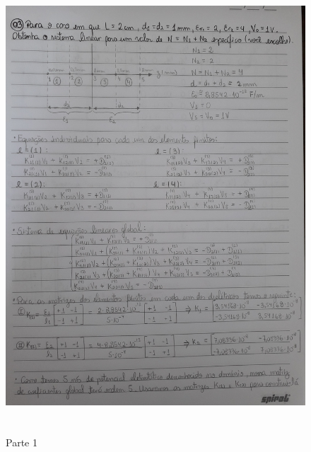 \documentclass[10pt]{article}
\begin{document}
\begin{itemize}
    \begin{figure}[!htb]
    \centerline{\includegraphics[width=16cm,height=17cm]{FormulaçõesExtras/f1.jpg}}
    \caption{Parte 1}
    \label{fig:f1}
    \end{figure}
    

\end{itemize}
\end{document}
